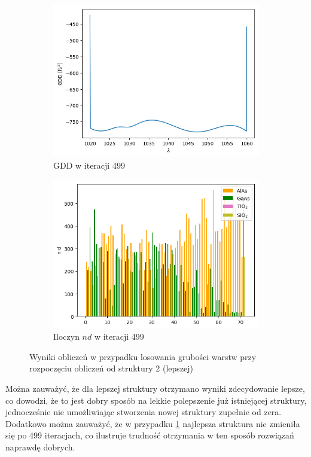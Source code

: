 \begin{figure} [H]
\begin{subfigure}[b]{0.31\textwidth}
        \includegraphics[width=\linewidth]{figures/wyniki/losowe/dbr_opt/result_gddresult499.png}
        \caption{GDD w iteracji 499}
    \end{subfigure}
        \begin{subfigure}[b]{0.32\textwidth}
        \includegraphics[width=\linewidth]{figures/wyniki/losowe/dbr_opt/result_ndresult499.png}
        \caption{Iloczyn $nd$ w iteracji 499}
    \end{subfigure}
    \caption{Wyniki obliczeń w przypadku losowania grubości warstw przy rozpoczęciu obliczeń od struktury 2 (lepszej)}
    \label{fig:wynlos2}
\end{figure}
\newpage
Można zauważyć, że dla lepszej struktury otrzymano wyniki zdecydowanie lepsze, co dowodzi, że to jest dobry sposób na lekkie polepszenie już istniejącej struktury, jednocześnie nie umożliwiając stworzenia nowej struktury zupełnie od zera. Dodatkowo można zauważyć, że w przypadku \ref{fig:wynlos2} najlepsza struktura nie zmieniła się po 499 iteracjach, co ilustruje trudność otrzymania w ten sposób rozwiązań naprawdę dobrych.

